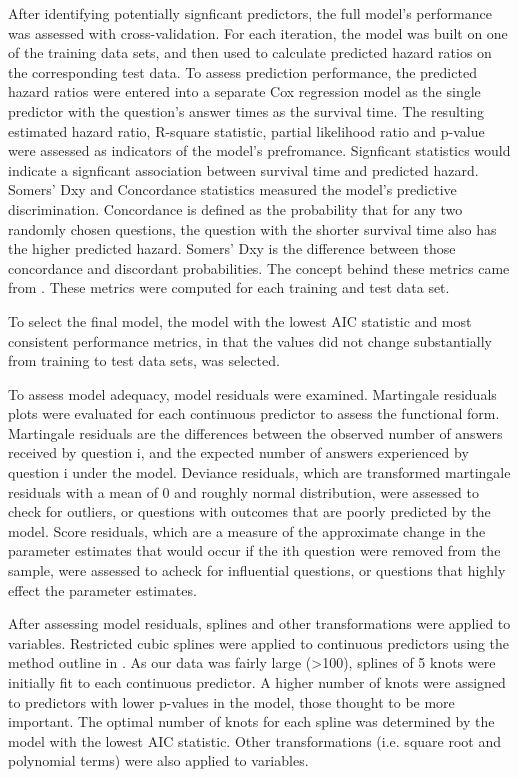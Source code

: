 \documentclass[12pt]{article}
\begin{document}
After identifying potentially signficant predictors, the full model's performance was assessed with cross-validation. For each iteration, the model was built on one of the training data sets, and then used to calculate predicted hazard ratios on the corresponding test data. To assess prediction performance, the predicted hazard ratios were entered into a separate Cox regression model as the single predictor with the question's answer times as the survival time. The resulting estimated hazard ratio, R-square statistic, partial likelihood ratio and p-value were assessed as indicators of the model's prefromance. Signficant statistics would indicate a signficant association between survival time and predicted hazard. Somers' Dxy and Concordance statistics measured the model's predictive discrimination. Concordance is defined as the probability that for any two randomly chosen questions, the question with the shorter survival time also has the higher predicted hazard. Somers' Dxy is the difference between those concordance and discordant probabilities. The concept behind these metrics came from \cite{Chen}. These metrics were computed for each training and test data set.



To select the final model, the model with the lowest AIC statistic and most consistent performance metrics, in that the values did not change substantially from training to test data sets, was selected.

To assess model adequacy, model residuals were examined. Martingale residuals plots were evaluated for each continuous predictor to assess the functional form. Martingale residuals are the differences between the observed number of answers received by question i, and the expected number of answers experienced by question i under the model. Deviance residuals, which are transformed martingale residuals with a mean of 0 and roughly normal distribution, were assessed to check for outliers, or questions with outcomes that are poorly predicted by the model. Score residuals, which are a measure of the approximate change in the parameter estimates that would occur if the ith question were removed from the sample, were assessed to acheck for influential questions, or questions that highly effect the parameter estimates. 

After assessing model residuals, splines and other transformations were applied to variables. Restricted cubic splines were applied to continuous predictors using the method outline in \cite{Harrell2015}. As our data was fairly large (>100), splines of 5 knots were initially fit to each continuous predictor. A higher number of knots were assigned to predictors with lower p-values in the model, those thought to be more important. The optimal number of knots for each spline was determined by the model with the lowest AIC statistic. Other transformations (i.e. square root and polynomial terms) were also applied to variables. 
\end{document}
